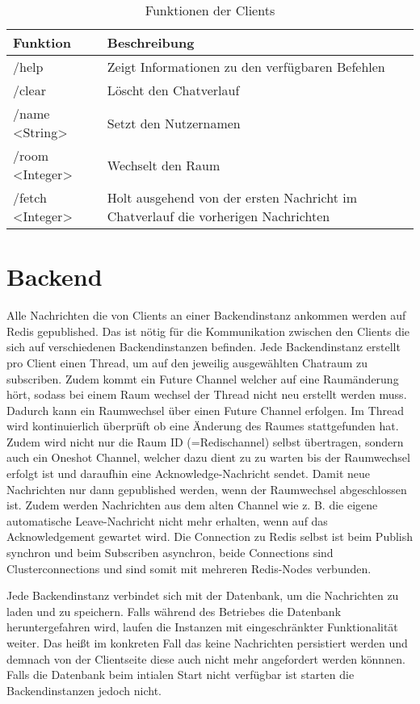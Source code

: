 \begin{table}[h!]
\begin{center}
\begin{tabular}{ | l | m{10cm} | }
\hline
\textbf{Funktion} & \textbf{Beschreibung} \\ 
\hline
/help & Zeigt Informationen zu den verfügbaren Befehlen \\ 
\hline
/clear & Löscht den Chatverlauf \\ 
\hline
/name <String> & Setzt den Nutzernamen \\ 
\hline
/room <Integer> & Wechselt den Raum \\ 
\hline
/fetch <Integer> & Holt ausgehend von der ersten Nachricht im Chatverlauf die vorherigen Nachrichten \\ 
\hline
\end{tabular}
\end{center}
\caption{Funktionen der Clients}
\label{tab:clientcommands}
\end{table}

\section{Backend}
Alle Nachrichten die von Clients an einer Backendinstanz ankommen werden auf Redis gepublished.
Das ist nötig für die Kommunikation zwischen den Clients die sich auf verschiedenen Backendinstanzen befinden.
Jede Backendinstanz erstellt pro Client einen Thread, um auf den jeweilig ausgewählten Chatraum zu subscriben.
Zudem kommt ein Future Channel welcher auf eine Raumänderung hört, sodass bei einem Raum wechsel der Thread nicht neu erstellt werden muss.
Dadurch kann ein Raumwechsel über einen Future Channel erfolgen. Im Thread wird kontinuierlich überprüft ob eine Änderung des Raumes stattgefunden hat.
Zudem wird nicht nur die Raum ID (=Redischannel) selbst übertragen, sondern auch ein Oneshot Channel, welcher dazu dient zu zu warten bis der Raumwechsel erfolgt ist und daraufhin eine Acknowledge-Nachricht sendet.
Damit neue Nachrichten nur dann gepublished werden, wenn der Raumwechsel abgeschlossen ist.
Zudem werden Nachrichten aus dem alten Channel wie z. B. die eigene automatische Leave-Nachricht nicht mehr erhalten, wenn auf das Acknowledgement gewartet wird.
Die Connection zu Redis selbst ist beim Publish synchron und beim Subscriben asynchron, beide Connections sind Clusterconnections und sind somit mit mehreren Redis-Nodes verbunden.

Jede Backendinstanz verbindet sich mit der Datenbank, um die Nachrichten zu laden und zu speichern.
Falls während des Betriebes die Datenbank heruntergefahren wird, laufen die Instanzen mit eingeschränkter Funktionalität weiter.
Das heißt im konkreten Fall das keine Nachrichten persistiert werden und demnach von der Clientseite diese auch nicht mehr angefordert werden könnnen.
Falls die Datenbank beim intialen Start nicht verfügbar ist starten die Backendinstanzen jedoch nicht.
